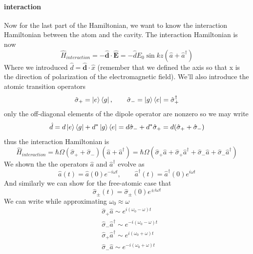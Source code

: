 \documentclass[english, a4paper, 12pt, twoside]{article}
\numberwithin{equation}{section} %
\begin{document}
\paragraph*{interaction}

Now for the last part of the Hamiltonian, we want to know the interaction Hamiltonian between the atom and the cavity. The interaction Hamiltonian is now 
\[
\hat{H}_{interaction} = -\hat{\textbf{d}}\cdot\hat{\textbf{E}} = -\hat{d} E_0 \sin{kz} (\hat{a} + \hat{a}^\dag{})
\]
Where we introduced $\hat{d} = \hat{\textbf{d}} \cdot \hat{x}$ (remember that we defined the axis so that x is the direction of polarization of the electromagnetic field).
We'll also introduce the atomic transition operators
\[
    \hat{\sigma}_+ = \ket{e}\bra{g}, \quad\quad \hat{\sigma}_- = \ket{g}\bra{e} = \hat{\sigma}_+^{\dag{}}
\]
only the off-diagonal elements of the dipole operator are nonzero so we may write
\[
    \hat{d} = d\ket{e}\bra{g} + d^* \ket{g}\bra{e} = d\hat{\sigma}_- + d^* \hat{\sigma}_+ = d(\hat{\sigma}_+ + \hat{\sigma}_-)
\]
thus the interaction Hamiltonian is
\begin{equation}
    \hat{H}_{interaction} = \hbar\Omega(\hat{\sigma}_+ + \hat{\sigma}_-)(\hat{a} +  \hat{a}^\dag) 
    = \hbar\Omega(\hat{\sigma}_+\hat{a} + \hat{\sigma}_+\hat{a}^\dag + \hat{\sigma}_-\hat{a} + \hat{\sigma}_-\hat{a}^\dag) 
\end{equation} \label{eq:interaction-hamiltonian}
We shown the the operators $\hat{a}$ and $\hat{a}^\dag{}$ evolve as
\begin{equation}
    \hat{a}(t) = \hat{a}(0)e^{-i\omega t}, \quad\quad \hat{a}^\dag{}(t) = \hat{a}^\dag{}(0)e^{i\omega t}
\end{equation}
And similarly we can show for the free-atomic case that
\begin{equation}
    \hat{\sigma}_{\pm}(t) =   \hat{\sigma}_{\pm}(0)e^{\pm i\omega t}
\end{equation}
We can write while approximating $\omega_0 \approx \omega$
\begin{equation}
    \begin{split}
        &\hat{\sigma}_+\hat{a} \sim e^{i(\omega_0 - \omega)t}\\
        &\hat{\sigma}_-\hat{a}^\dag \sim e^{-i(\omega_0 - \omega)t}\\
        &\hat{\sigma}_+\hat{a}^\dag \sim e^{i(\omega_0 + \omega)t}\\
        &\hat{\sigma}_-\hat{a} \sim e^{-i(\omega_0 + \omega)t}
    \end{split}
\end{equation}
\end{document}
